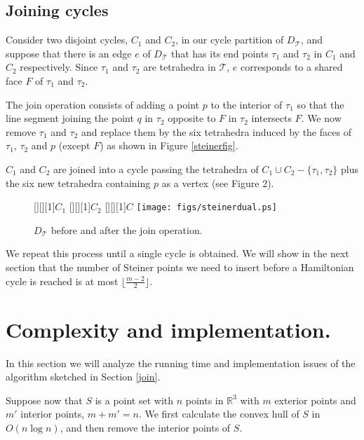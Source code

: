 \documentclass{article}
\begin{document}
\subsection{Joining cycles} \label{joincycles}


Consider two disjoint cycles,
$C_1$ and $C_2$, in our cycle partition of $D_\mathcal{T}$, and 
 suppose that there is an edge $e$ of $D_\mathcal{T}$
 that has its end points $\tau_1$ and 
$\tau_2$  in $C_1$ and $C_2$ 
respectively. Since $\tau_1$ and $\tau_2$ are tetrahedra in
$\mathcal{T}$, $e$ corresponds to a shared face $F$ of 
$\tau_1$ and $\tau_2$.\par

The join operation consists of adding a point $p$ to 
the interior of $\tau_1$ so that the line segment
joining the point $q$ in $\tau_2$ opposite to $F$ in $\tau_2$
intersects $F$. We now remove  $\tau_1$ and
$\tau_2$ and replace them by the six tetrahedra 
induced by the faces of  $\tau_1$,
$\tau_2$ and $p$ (except $F$) as shown in  Figure \ref{steinerfig}.

$C_1$ and $C_2$ are joined into a cycle passing the tetrahedra of 
$C_1 \cup C_2 - \{\tau_1, \tau_2\}$ plus
the six new tetrahedra containing $p$ as a vertex
(see Figure 2).\par

\begin{figure} \label{dualsteiner}
  \begin{center}
	[][][1]{$C_1$}
    [][][1]{$C_2$}
    [][][1]{$C$}					
	\texttt{[image: figs/steinerdual.ps]}
  \end{center}
    \caption{$D_\mathcal{T}$ before and after the join operation.}
\end{figure}

We repeat this process until a single cycle is obtained.
We will show in the next section that the number of 
Steiner points we need to insert before  a Hamiltonian
cycle is reached is at most $\lfloor \frac{m-2}{2} \rfloor$. 

 
\section{Complexity and implementation.} \label{alg}

In this section we will analyze the running time and 
implementation issues of the algorithm sketched in Section 
\ref{join}.\par

Suppose now that $S$ is a point set with $n$ points in
$\mathbb{R}^3$ with $m$ exterior points and $m'$ interior 
points, $m+m'=n$.
We first calculate the convex hull of 
$S$ in $O(n \log n)$, and then remove the interior points of $S$.\par
\end{document}
